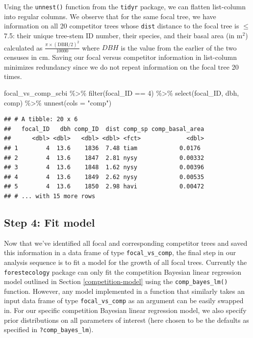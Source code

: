 \documentclass[12pt]{article}
\newenvironment{Shaded}{\begin{snugshade}}{\end{snugshade}}
\newcommand{\AttributeTok}[1]{\textcolor[rgb]{0.77,0.63,0.00}{#1}}
\newcommand{\DecValTok}[1]{\textcolor[rgb]{0.00,0.00,0.81}{#1}}
\newcommand{\FunctionTok}[1]{\textcolor[rgb]{0.00,0.00,0.00}{#1}}
\newcommand{\NormalTok}[1]{#1}
\newcommand{\SpecialCharTok}[1]{\textcolor[rgb]{0.00,0.00,0.00}{#1}}
\newcommand{\StringTok}[1]{\textcolor[rgb]{0.31,0.60,0.02}{#1}}
\begin{document}
Using the \texttt{unnest()} function from the \texttt{tidyr} package, we
can flatten list-column into regular columns. We observe that for the
same focal tree, we have information on all 20 competitor trees whose
\texttt{dist} distance to the focal tree is \(\leq\) 7.5: their unique
tree-stem ID number, their species, and their basal area (in m\(^2\))
calculated as \(\frac{\pi \times (\text{DBH/2})^2}{10000}\) where
\(DBH\) is the value from the earlier of the two censuses in cm. Saving
our focal versus competitor information in list-column minimizes
redundancy since we do not repeat information on the focal tree 20
times.

\begin{Shaded}
\begin{Highlighting}[]
\NormalTok{focal\_vs\_comp\_scbi }\SpecialCharTok{\%\textgreater{}\%} 
  \FunctionTok{filter}\NormalTok{(focal\_ID }\SpecialCharTok{==} \DecValTok{4}\NormalTok{) }\SpecialCharTok{\%\textgreater{}\%} 
  \FunctionTok{select}\NormalTok{(focal\_ID, dbh, comp) }\SpecialCharTok{\%\textgreater{}\%} 
  \FunctionTok{unnest}\NormalTok{(}\AttributeTok{cols =} \StringTok{"comp"}\NormalTok{)}
\end{Highlighting}
\end{Shaded}

\begin{verbatim}
## # A tibble: 20 x 6
##   focal_ID   dbh comp_ID  dist comp_sp comp_basal_area
##      <dbl> <dbl>   <dbl> <dbl> <fct>             <dbl>
## 1        4  13.6    1836  7.48 tiam            0.0176 
## 2        4  13.6    1847  2.81 nysy            0.00332
## 3        4  13.6    1848  1.62 nysy            0.00396
## 4        4  13.6    1849  2.62 nysy            0.00535
## 5        4  13.6    1850  2.98 havi            0.00472
## # ... with 15 more rows
\end{verbatim}

\hypertarget{model-fit-predict}{%
\subsection{Step 4: Fit model}\label{model-fit-predict}}

Now that we've identified all focal and corresponding competitor trees
and saved this information in a data frame of type
\texttt{focal\_vs\_comp}, the final step in our analysis sequence is to
fit a model for the growth of all focal trees. Currently the
\texttt{forestecology} package can only fit the competition Bayesian
linear regression model outlined in Section \ref{competition-model}
using the \texttt{comp\_bayes\_lm()} function. However, any model
implemented in a function that similarly takes an input data frame of
type \texttt{focal\_vs\_comp} as an argument can be easily swapped in.
For our specific competition Bayesian linear regression model, we also
specify prior distributions on all parameters of interest (here chosen
to be the defaults as specified in \texttt{?comp\_bayes\_lm}).
\end{document}
